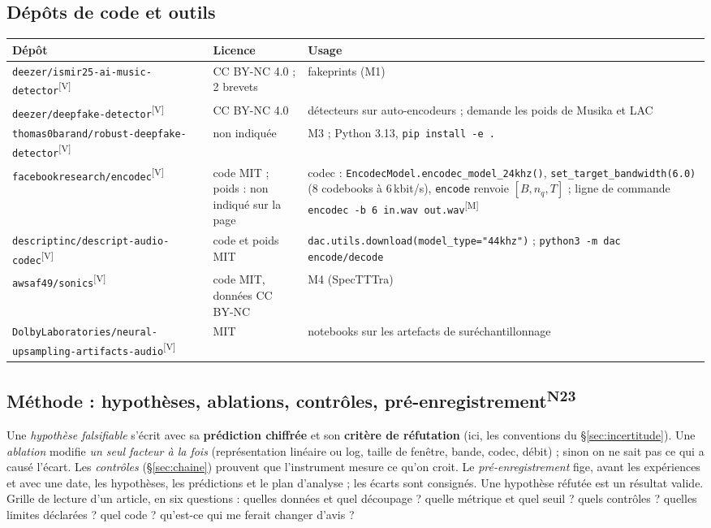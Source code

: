 \documentclass[10pt,a4paper]{article}
\newcommand{\sV}{\textsuperscript{\scriptsize\textcolor{green!40!black}{[V]}}}
\newcommand{\sM}{\textsuperscript{\scriptsize\textcolor{red!70!black}{[M]}}}
\newcommand{\nref}[1]{\textsuperscript{\scriptsize\textcolor{black!55}{#1}}}
\begin{document}
\subsection{Dépôts de code et outils}
\begin{center}\footnotesize
\begin{tabularx}{\textwidth}{@{}L{5.6cm}L{2.6cm}>{\raggedright\arraybackslash}X@{}}
\toprule
\textbf{Dépôt} & \textbf{Licence} & \textbf{Usage}\\
\midrule
\texttt{deezer/\allowbreak ismir25-\allowbreak ai-music-\allowbreak detector}\sV & CC BY-NC 4.0 ; 2 brevets & fakeprints (M1)\\
\texttt{deezer/\allowbreak deepfake-\allowbreak detector}\sV & CC BY-NC 4.0 & détecteurs sur auto-encodeurs ; demande les poids de Musika et LAC\\
\texttt{thomas0barand/\allowbreak robust-\allowbreak deepfake-\allowbreak detector}\sV & non indiquée & M3 ; Python 3.13, \texttt{pip install -e .}\\
\texttt{facebookresearch/\allowbreak encodec}\sV & code MIT ; poids : non indiqué sur la page & codec : \texttt{EncodecModel.encodec\_model\_24khz()}, \texttt{set\_target\_bandwidth(6.0)} (8 codebooks à 6\,kbit/s), \texttt{encode} renvoie $[B,n_q,T]$ ; ligne de commande \texttt{encodec -b 6 in.wav out.wav}\sM\\
\texttt{descriptinc/\allowbreak descript-\allowbreak audio-codec}\sV & code et poids MIT & \texttt{dac.utils.download(model\_type="44khz")} ; \texttt{python3 -m dac encode/decode}\\
\texttt{awsaf49/sonics}\sV & code MIT, données CC BY-NC & M4 (SpecTTTra)\\
\texttt{DolbyLaboratories/\allowbreak neural-\allowbreak upsampling-\allowbreak artifacts-\allowbreak audio}\sV & MIT & notebooks sur les artefacts de suréchantillonnage\\
\bottomrule
\end{tabularx}
\end{center}

\subsection{Méthode : hypothèses, ablations, contrôles, pré-enregistrement\nref{N23}}
Une \emph{hypothèse falsifiable} s'écrit avec sa \textbf{prédiction chiffrée} et son \textbf{critère de réfutation} (ici, les conventions du §\ref{sec:incertitude}). Une \emph{ablation} modifie \emph{un seul facteur à la fois} (représentation linéaire ou log, taille de fenêtre, bande, codec, débit) ; sinon on ne sait pas ce qui a causé l'écart. Les \emph{contrôles} (§\ref{sec:chaine}) prouvent que l'instrument mesure ce qu'on croit. Le \emph{pré-enregistrement} fige, avant les expériences et avec une date, les hypothèses, les prédictions et le plan d'analyse ; les écarts sont consignés. Une hypothèse réfutée est un résultat valide. Grille de lecture d'un article, en six questions : quelles données et quel découpage ? quelle métrique et quel seuil ? quels contrôles ? quelles limites déclarées ? quel code ? qu'est-ce qui me ferait changer d'avis ?
\end{document}
